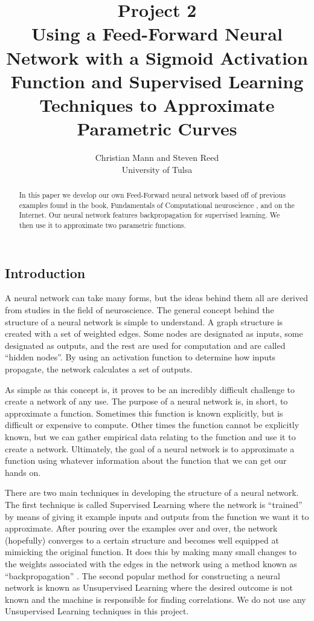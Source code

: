 \documentclass{article}
\title{Project 2\\Using a Feed-Forward Neural Network with a Sigmoid Activation Function and Supervised Learning Techniques to Approximate Parametric Curves}
\author{Christian Mann and Steven Reed \\
		University of Tulsa}
\begin{document}
\maketitle

\begin{multicols}{2}

\begin{abstract}
In this paper we develop our own Feed-Forward neural network based off of previous examples found in the book, Fundamentals of Computational neuroscience \cite{trappenberg}, and on the Internet. Our neural network features backpropagation for supervised learning. We then use it to approximate two parametric functions.
\end{abstract}

\section{Introduction}

A neural network can take many forms, but the ideas behind them all are derived from studies in the field of neuroscience. The general concept behind the structure of a neural network is simple to understand. A graph structure is created with a set of weighted edges. Some nodes are designated as inputs, some designated as outputs, and the rest are used for computation and are called ``hidden nodes''. By using an activation function to determine how inputs propagate, the network calculates a set of outputs.

As simple as this concept is, it proves to be an incredibly difficult challenge to create a network of any use. The purpose of a neural network is, in short, to approximate a function. Sometimes this function is known explicitly, but is difficult or expensive to compute. Other times the function cannot be explicitly known, but we can gather empirical data relating to the function and use it to create a network. Ultimately, the goal of a neural network is to approximate a function using whatever information about the function that we can get our hands on.

There are two main techniques in developing the structure of a neural network. The first technique is called Supervised Learning where the network is ``trained'' by means of giving it example inputs and outputs from the function we want it to approximate. After pouring over the examples over and over, the network (hopefully) converges to a certain structure and becomes well equipped at mimicking the original function. It does this by making many small changes to the weights associated with the edges in the network using a method known as ``backpropagation'' \cite{trappenberg}. The second popular method for constructing a neural network is known as Unsupervised Learning where the desired outcome is not known and the machine is responsible for finding correlations. We do not use any Unsupervised Learning techniques in this project.


\end{multicols}
\end{document}
